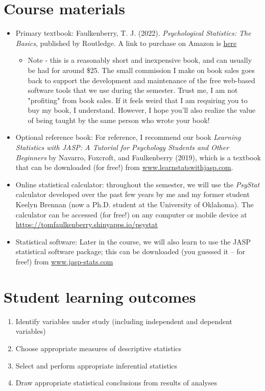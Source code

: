 \documentclass[10pt]{article}
\begin{document}
\section*{Course materials}
\label{sec:orgcd17446}
\begin{itemize}
\item Primary textbook: Faulkenberry, T. J. (2022). \emph{Psychological Statistics: The Basics}, published by Routledge. A link to purchase on Amazon is \href{https://www.amazon.com/Psychological-Statistics-Basics-Thomas-Faulkenberry/dp/1032020954/}{here}
\begin{itemize}
\item Note - this is a reasonably short and inexpensive book, and can usually be had for around \$25. The small commission I make on book sales goes back to support the development and maintenance of the free web-based software tools that we use during the semester. Trust me, I am not "profiting" from book sales. If it feels weird that I am requiring you to buy my book, I understand. However, I hope you'll also realize the value of being taught by the same person who wrote your book!
\end{itemize}

\item Optional reference book: For reference, I recommend our book \emph{Learning Statistics with JASP: A Tutorial for Psychology Students and Other Beginners} by Navarro, Foxcroft, and Faulkenberry (2019), which is a textbook that can be downloaded (for free!) from \href{http://learnstatswithjasp.com}{www.learnstatswithjasp.com}.

\item Online statistical calculator: throughout the semester, we will use the \emph{PsyStat} calculator developed over the past few years by me and my former student Keelyn Brennan (now a Ph.D. student at the University of Oklahoma). The calculator can be accessed (for free!) on any computer or mobile device at \url{https://tomfaulkenberry.shinyapps.io/psystat}

\item Statistical software: Later in the course, we will also learn to use the JASP statistical software package; this can be downloaded (you guessed it -- for free!) from \href{http://www.jasp-stats.com}{www.jasp-stats.com}
\end{itemize}

\section*{Student learning outcomes}
\label{sec:orge898fa5}
\begin{enumerate}
\item Identify variables under study (including independent and dependent variables)
\item Choose appropriate measures of descriptive statistics
\item Select and perform appropriate inferential statistics
\item Draw appropriate statistical conclusions from results of analyses
\end{enumerate}
\end{document}
